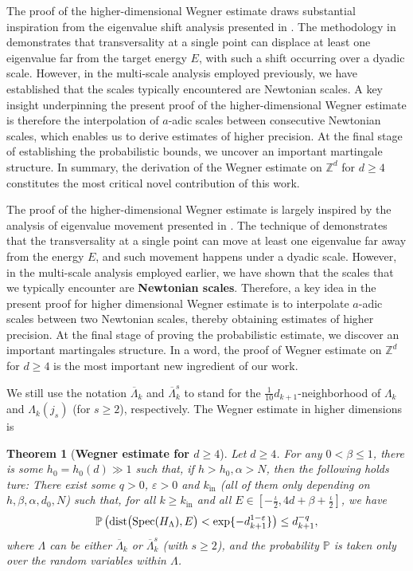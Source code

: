 \documentclass[11pt,reqno,UTF8,twoside]{amsart}
\newcommand{\Z}{\mathbb{Z}}
\newcommand{\spec}{{\rm Spec}}
\renewcommand{\P}{\mathbb{P}}
\newcommand{\dist}{{\rm dist}}
\newtheorem{thm}{Theorem}[section]
\theoremstyle{definition}
\numberwithin{equation}{section}
\begin{document}
The proof of the higher-dimensional Wegner estimate draws substantial inspiration from the eigenvalue shift analysis presented in \cite{Imb21}. The methodology in \cite{Imb21} demonstrates that transversality at a single point can displace at least one eigenvalue far from the target energy $E$, with such a shift occurring over a dyadic scale. However, in the multi-scale analysis employed previously, we have established that the scales typically encountered are Newtonian scales. A key insight underpinning the present proof of the higher-dimensional Wegner estimate is therefore the interpolation of $a$-adic scales between consecutive Newtonian scales, which enables us to derive estimates of higher precision. At the final stage of establishing the probabilistic bounds, we uncover an important martingale structure. In summary, the derivation of the Wegner estimate on $\Z^d$ for $d\ge 4$ constitutes the most critical novel contribution of this work.

The proof of  the higher-dimensional  Wegner estimate   is largely inspired by the analysis of eigenvalue movement   presented in \cite{Imb21}. The technique  of \cite{Imb21} demonstrates  that the transversality at a single point can move at least one eigenvalue far away from the energy $E$, and such movement happens under a dyadic scale.  %
However, in the  multi-scale analysis employed earlier, we have shown that the scales that we typically encounter  are {\bf Newtonian scales}. Therefore, a key idea in the present proof for higher dimensional Wegner estimate  is to interpolate $a$-adic scales between two Newtonian scales, thereby obtaining estimates of higher precision. At the final stage of proving the probabilistic estimate, we discover an important martingales structure.  In a word, the proof of Wegner estimate on $\Z^d$ for $d\geq 4$ is the  most important new ingredient of our work. 

We still use the notation $\overline{\Lambda}_k$ and $\overline{\Lambda}_{k}^s$ to stand for the $\frac{1}{10}d_{k+1}$-neighborhood of $\Lambda_k$ and $\Lambda_k(j_s)$ (for $s\geq 2$), respectively. The Wegner estimate in higher dimensions  is  
\begin{thm}[{\bf Wegner estimate for $d\geq 4$}]\label{Wegner estimate for d>3}
 Let $d\geq 4$. For any $0<\beta \leq 1$, there is  some $h_0=h_0(d) \gg 1$ such that,  if $h>h_0,\alpha > N$, then the following holds ture: There exist  some  $q>0$,  $\varepsilon>0$ and  $k_{\text{in}}$ (all of them only  depending  on $h,\beta,\alpha,d_0,N$) such that,  for all $k \geq k_{\text{in}}$ and all $E\in [-\frac{\iota}{2},4d+\beta+\frac{\iota}{2}]$, we have 
\begin{equation}\label{Wegner poly probability 2}
\P\left( \dist\big(\spec(H_{\Lambda}), E\big) < \exp\{-d_{k+1}^{1-\varepsilon}\} \right) \leq d_{k+1}^{-q},
\end{equation}
where $ {\Lambda}$ can be either $\overline{\Lambda}_k$ or $\overline{\Lambda}_k^s$ (with $s\geq 2$), and the probability $\P$ is taken only over the random variables  within $\Lambda$.
\end{thm}
\end{document}

